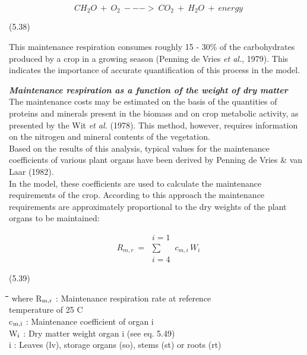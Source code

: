 \documentclass[11pt]{article}
\begin{document}
\begin{displaymath}
CH _{2} O ~+~ O _{2} ~--->~ CO _{2} ~+~ H _{2} O ~+~ energy
\end{displaymath}

 \bigskip
\strut\hfill (5.38)
 
This maintenance respiration consumes roughly 15 - 30\% of the carbohy\-drates produced
by a crop in a growing season (Penning de Vries {\it et al.\/}, 1979). This indicates the
importance of accurate quantification of this process in the model.

\bigskip
{\bf {\it Maintenance respiration as a function of the weight of dry matter\/}}\\
The maintenance costs may be estimated on the basis of the quantities of proteins and
minerals present in the biomass and on crop metabolic activity, as presented by the Wit {\it et
al.\/} (1978). This method, however, requires information on the nitrogen and mineral
contents of the vegetation.\\
Based on the results of this analysis, typical values for the maintenance coefficients of
various plant organs have been derived by Penning de Vries \& van Laar (1982). \\
In the model, these coefficients are used to calculate the maintenance requirements of the
crop. According to this approach the maintenance requirements are approxi\-mately propor\-tional to the dry weights of the plant organs to be maintained: 

\begin{displaymath}
R _{m,r} ~ = ~\begin{array}{c} {i=1}  \\
\sum  \\
{i=4}\end{array} \, c _{m,i} \, W _{i}
\end{displaymath}

\bigskip
\strut\hfill (5.39)

\nwln
\begin{tabbing}
\hspace{1.27cm}\=\hspace{1.27cm}\=\hspace{1.27cm}\=\hspace{1.27cm}\=%
\hspace{1.27cm}\=\hspace{1.27cm}\=\hspace{1.27cm}\=\hspace{1.27cm}\=%
\hspace{1.27cm}\=\hspace{1.27cm}\=\kill
where\> R$_{{\rm m,r}}$\> : Maintenance respiration rate at reference \\
\>\>   temperature of 25 \degrees C\> \> \> \> \> \> \> \> [kg ha$^{{\rm -1}}$ d$^{{\rm -1}}$]\\
\>c$_{{\rm m,i}}$\> : Maintenance coefficient of organ i\> \> \> \> \> \> \> \> [kg kg$^{{\rm -1}}$ d$^{{\rm -1}}$]\\
\>W$_{{\rm i}}$\> : Dry matter weight organ i (see eq. 5.49)\> \> \> \> \> \> \> \> [kg ha$^{{\rm -1}}$]\\
\>i\> : Leaves (lv), storage organs (so), stems (st) or roots (rt) 
\end{tabbing}
\end{document}
